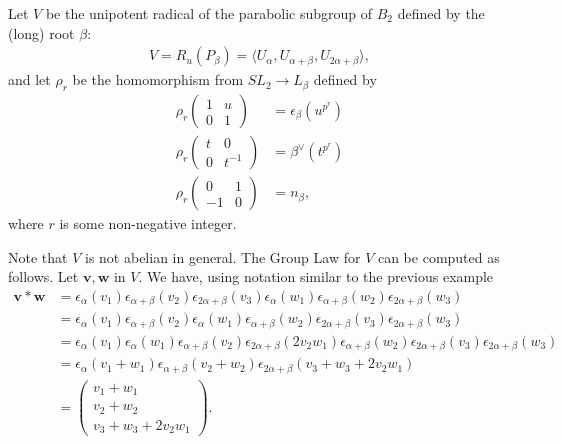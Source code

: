 Let $V$ be the unipotent radical of the parabolic subgroup of $B_2$ defined by the (long) root $\beta$:
\begin{align*}
V=R_u(P_\beta)=\langle U_\alpha, U_{\alpha + \beta}, U_{2\alpha + \beta} \rangle,
\end{align*}
and let $\rho_r$ be the homomorphism from $SL_2 \rightarrow L_\beta$ defined by
\begin{align*}
\rho_r\left(\begin{matrix} 1 & u \\ 0 & 1\end{matrix}\right) &= \epsilon_\beta(u^{p^r}) \\
\rho_r\left(\begin{matrix} t & 0 \\ 0 & t^{-1}\end{matrix}\right) &= \beta^\vee(t^{p^r}) \\
\rho_r\left(\begin{matrix} 0 & 1 \\ -1 & 0\end{matrix}\right) &= n_\beta,
\end{align*}
where $r$ is some non-negative integer.

Note that $V$ is not abelian in general. The Group Law for $V$ can be computed as follows. Let $\mathbf{v}, \mathbf{w}$ in $V$. We have, using notation similar to the previous example
\begin{align*}
\mathbf{v}*\mathbf{w}
&= 
\epsilon_\alpha(v_1)\epsilon_{\alpha+\beta}(v_2)\epsilon_{2\alpha+\beta}(v_3) \epsilon_\alpha(w_1)\epsilon_{\alpha+\beta}(w_2)\epsilon_{2\alpha+\beta}(w_3)\\
&= 
\epsilon_\alpha(v_1)\epsilon_{\alpha+\beta}(v_2) \epsilon_\alpha(w_1)\epsilon_{\alpha+\beta}(w_2)\epsilon_{2\alpha+\beta}(v_3)\epsilon_{2\alpha+\beta}(w_3)\\
&= 
\epsilon_\alpha(v_1) \epsilon_\alpha(w_1) \epsilon_{\alpha + \beta}(v_2)\epsilon_{2\alpha+\beta}(2v_2w_1)\epsilon_{\alpha+\beta}(w_2)\epsilon_{2\alpha+\beta}(v_3)\epsilon_{2\alpha+\beta}(w_3)\\
&= 
\epsilon_\alpha(v_1 + w_1) \epsilon_{\alpha + \beta}(v_2 + w_2)\epsilon_{2\alpha+\beta}(v_3 + w_3 + 2v_2w_1)\\
&=
\left(\begin{matrix}
v_1 + w_1 \\
v_2 + w_2 \\
v_3 + w_3 + 2v_2w_1
\end{matrix}\right).
\end{align*}

